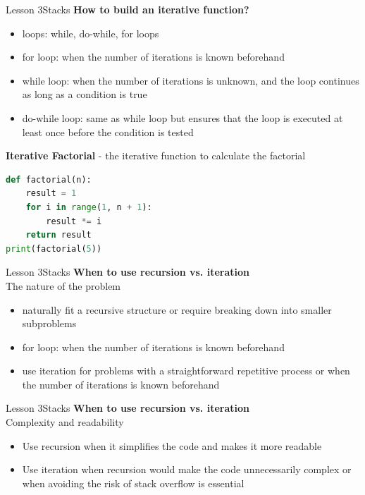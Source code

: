 \documentclass[aspectratio=1610]{beamer}
\begin{document}
\begin{frame}{Lesson 3}{Stacks}
\LARGE
\textbf{How to build an iterative function?}\\
\begin{itemize}
    \item loops: while, do-while, for loops
    \item for loop: when the number of iterations is known beforehand
    \item while loop: when the number of iterations is unknown, and the loop continues as long as a condition is true
    \item do-while loop: same as while loop but ensures that the loop is executed at least once before the condition is tested
\end{itemize}
\end{frame}



\begin{frame}[fragile]
\LARGE
\textbf{Iterative Factorial} - the iterative function to calculate the factorial\\
\Large
\begin{lstlisting}[language=Python]
def factorial(n):
    result = 1
    for i in range(1, n + 1):
        result *= i
    return result
print(factorial(5))
 \end{lstlisting}
\end{frame}



\begin{frame}{Lesson 3}{Stacks}
\LARGE
\textbf{When to use recursion vs. iteration}\\
The nature of the problem
\begin{itemize}
    \item naturally fit a recursive structure or require breaking down into smaller subproblems
    \item for loop: when the number of iterations is known beforehand
    \item use iteration for problems with a straightforward repetitive process or when the number of iterations is known beforehand
\end{itemize}
\end{frame}


\begin{frame}{Lesson 3}{Stacks}
\LARGE
\textbf{When to use recursion vs. iteration}\\
Complexity and readability
\begin{itemize}
    \item Use recursion when it simplifies the code and makes it more readable
    \item Use iteration when recursion would make the code unnecessarily complex or when avoiding the risk of stack overflow is essential
\end{itemize}
\end{frame}
\end{document}
